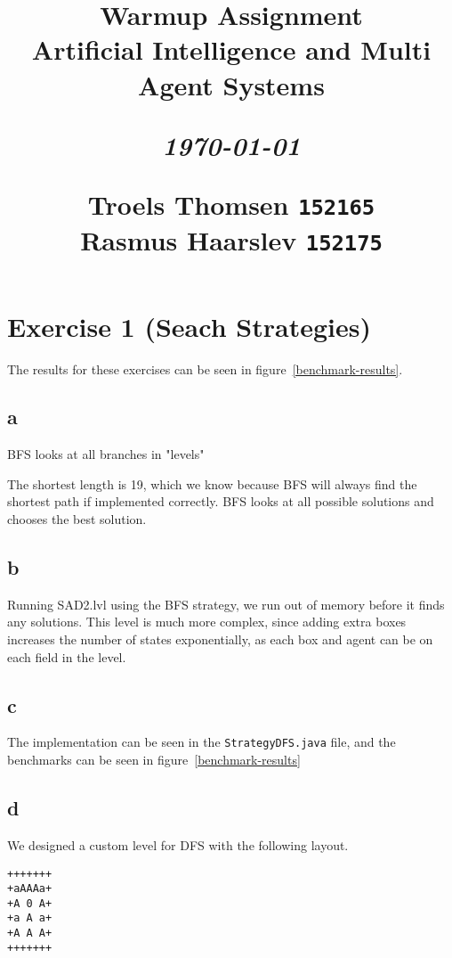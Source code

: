 \documentclass[12pt]{article}
\title{
  \vspace{4cm}
  \begin{flushleft}
  \Large{\textbf{Warmup Assignment}} \\
  \large{Artificial Intelligence and Multi Agent Systems}
  \end{flushleft}
  \vspace{0cm}
  \begin{flushleft}
  \small
  \textit{\today}
  \end{flushleft}
  \vspace{12cm}
  \begin{flushleft}
  \small
  Troels Thomsen \texttt{152165} \\
  Rasmus Haarslev \texttt{152175} \\
  \end{flushleft}
}
\date{
}
\begin{document}
\clearpage
{}
\thispagestyle{empty}
\maketitle

\newpage

\section{Exercise 1 (Seach Strategies)}

The results for these exercises can be seen in figure~\ref{benchmark-results}.


\subsection{a}
\label{sub:a}

BFS looks at all branches in "levels"

The shortest length is 19, which we know because BFS will always find the shortest path if implemented correctly. BFS looks at all possible solutions and chooses the best solution.


\subsection{b}
\label{sub:b}

Running SAD2.lvl using the BFS strategy, we run out of memory before it finds any solutions.
This level is much more complex, since adding extra boxes increases the number of states exponentially, as each box and agent can be on each field in the level.


\subsection{c}
\label{sub:c}

The implementation can be seen in the \texttt{StrategyDFS.java} file, and the benchmarks can be seen in figure~\ref{benchmark-results}


\subsection{d}
\label{sub:d}

We designed a custom level for DFS with the following layout.

\begin{verbatim}
+++++++
+aAAAa+
+A 0 A+
+a A a+
+A A A+
+++++++
\end{verbatim}
\end{document}
